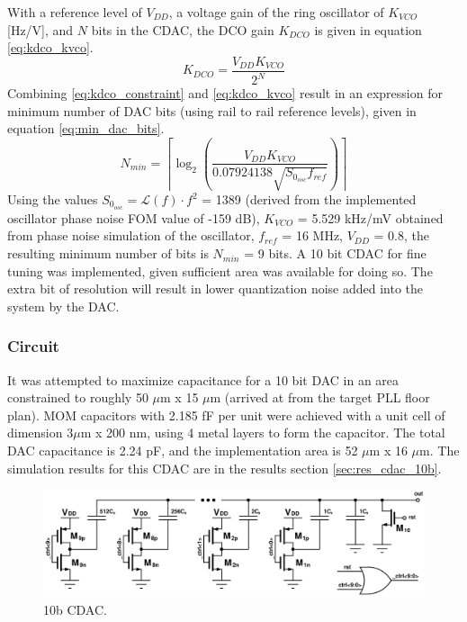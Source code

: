 	With a reference level of $V_{DD}$, a voltage gain of the ring oscillator of $K_{VCO}$ [Hz/V], and $N$ bits in the CDAC, the DCO gain $K_{DCO}$ is given in equation \ref{eq:kdco_kvco}.
	\begin{equation}\label{eq:kdco_kvco}
		K_{DCO} = \frac{V_{DD}K_{VCO}}{2^N}
	\end{equation}
	Combining \ref{eq:kdco_constraint} and \ref{eq:kdco_kvco} result in an expression for minimum number of DAC bits (using rail to rail reference levels), given in equation \ref{eq:min_dac_bits}.
	\begin{equation}\label{eq:min_dac_bits}
		N_{min} = \left\lceil \log_2\left( \frac{V_{DD}K_{VCO}}{0.07924138\sqrt{S_{0_{osc}} f_{ref}}} \right)\right\rceil
	\end{equation}
	Using the values $S_{0_{osc}} = \mathcal{L}(f)\cdot f^2$ = 1389 (derived from the implemented oscillator phase noise FOM value of -159 dB), $K_{VCO}$ = 5.529 kHz/mV obtained from phase noise simulation of the oscillator, $f_{ref}$ = 16 MHz, $V_{DD}$ = 0.8, the resulting minimum number of bits is $N_{min}$ = 9 bits.  A 10 bit CDAC for fine tuning was implemented, given sufficient area was available for doing so. The extra bit of resolution will result in lower quantization noise added into the system by the DAC.

		\subsubsection{Circuit}
		It was attempted to maximize capacitance for a 10 bit DAC in an area constrained to roughly 50 $\mu$m x 15 $\mu$m (arrived at from the target PLL floor plan). MOM capacitors with 2.185 fF per unit were achieved with a unit cell of dimension 3$\mu$m x 200 nm, using 4 metal layers to form the capacitor. The total DAC capacitance is 2.24 pF, and the implementation area is 52 $\mu$m x 16 $\mu$m. The simulation results for this CDAC are in the results section \ref{sec:res_cdac_10b}.
	
			\begin{figure}[htb!]
			        \centering
			        \includegraphics[width=\textwidth, angle=0]{./figs/design/cdac_10b}
			    \caption{10b CDAC.}
			    \label{fig:10b_cdac_cir}
			\end{figure}

